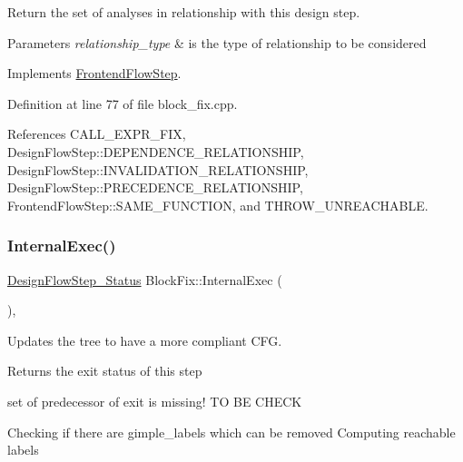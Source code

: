 Return the set of analyses in relationship with this design step. 


\begin{DoxyParams}{Parameters}
{\em relationship\+\_\+type} & is the type of relationship to be considered \\
\hline
\end{DoxyParams}


Implements \hyperlink{classFrontendFlowStep_abeaff70b59734e462d347ed343dd700d}{Frontend\+Flow\+Step}.



Definition at line 77 of file block\+\_\+fix.\+cpp.



References C\+A\+L\+L\+\_\+\+E\+X\+P\+R\+\_\+\+F\+IX, Design\+Flow\+Step\+::\+D\+E\+P\+E\+N\+D\+E\+N\+C\+E\+\_\+\+R\+E\+L\+A\+T\+I\+O\+N\+S\+H\+IP, Design\+Flow\+Step\+::\+I\+N\+V\+A\+L\+I\+D\+A\+T\+I\+O\+N\+\_\+\+R\+E\+L\+A\+T\+I\+O\+N\+S\+H\+IP, Design\+Flow\+Step\+::\+P\+R\+E\+C\+E\+D\+E\+N\+C\+E\+\_\+\+R\+E\+L\+A\+T\+I\+O\+N\+S\+H\+IP, Frontend\+Flow\+Step\+::\+S\+A\+M\+E\+\_\+\+F\+U\+N\+C\+T\+I\+ON, and T\+H\+R\+O\+W\+\_\+\+U\+N\+R\+E\+A\+C\+H\+A\+B\+LE.

\mbox{\label{classBlockFix_aa2b241ca4f66e4eeb51e051fdd464772}} 
\subsubsection{\texorpdfstring{Internal\+Exec()}{InternalExec()}}
{\footnotesize\ttfamily \hyperlink{design__flow__step_8hpp_afb1f0d73069c26076b8d31dbc8ebecdf}{Design\+Flow\+Step\+\_\+\+Status} Block\+Fix\+::\+Internal\+Exec (\begin{DoxyParamCaption}{ }\end{DoxyParamCaption})\hspace{0.3cm}{\ttfamily [override]}, {\ttfamily [virtual]}}



Updates the tree to have a more compliant C\+FG. 

\begin{DoxyReturn}{Returns}
the exit status of this step 
\end{DoxyReturn}
set of predecessor of exit is missing! TO BE C\+H\+E\+CK

Checking if there are gimple\+\_\+labels which can be removed Computing reachable labels 

